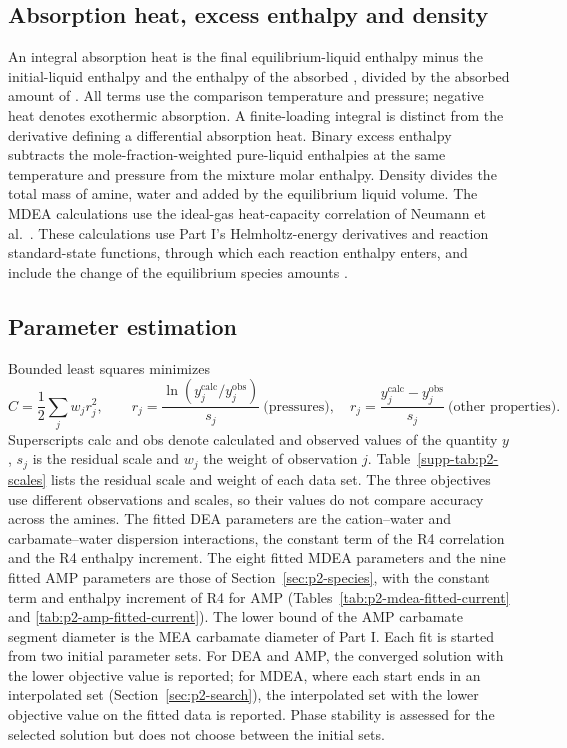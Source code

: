 \subsection{Absorption heat, excess enthalpy and density}\label{sec:p2-caloric}
An integral absorption heat is the final equilibrium-liquid enthalpy minus the initial-liquid enthalpy and the enthalpy of the absorbed \COtwo, divided by the absorbed amount of \COtwo.
All terms use the comparison temperature and pressure; negative heat denotes exothermic absorption.
A finite-loading integral is distinct from the derivative defining a differential absorption heat.
Binary excess enthalpy subtracts the mole-fraction-weighted pure-liquid enthalpies at the same temperature and pressure from the mixture molar enthalpy.
Density divides the total mass of amine, water and added \COtwo by the equilibrium liquid volume.
The MDEA calculations use the ideal-gas heat-capacity correlation of Neumann et al.\ \cite{neumannThermodynamicPropertiesMethyl2022}.
These calculations use Part I's Helmholtz-energy derivatives and reaction standard-state functions, through which each reaction enthalpy enters, and include the change of the equilibrium species amounts \cite[Sects.~2--3]{PolleyPartI}.

\subsection{Parameter estimation}\label{sec:p2-estimation}
Bounded least squares minimizes
\begin{equation}
 C=\frac12\sum_j w_jr_j^2,\qquad
 r_j=\frac{\ln(y_j^{\mathrm{calc}}/y_j^{\mathrm{obs}})}{s_j}\ \text{(pressures)},\quad
 r_j=\frac{y_j^{\mathrm{calc}}-y_j^{\mathrm{obs}}}{s_j}\ \text{(other properties)}.
 \label{eq:p2-objective}
\end{equation}
Superscripts calc and obs denote calculated and observed values of the quantity $y$, $s_j$ is the residual scale and $w_j$ the weight of observation $j$.
Table~\ref{supp-tab:p2-scales} lists the residual scale and weight of each data set.
The three objectives use different observations and scales, so their values do not compare accuracy across the amines.
The fitted DEA parameters are the cation--water and carbamate--water dispersion interactions, the constant term of the R4 correlation and the R4 enthalpy increment.
The eight fitted MDEA parameters and the nine fitted AMP parameters are those of Section~\ref{sec:p2-species}, with the constant term and enthalpy increment of R4 for AMP (Tables~\ref{tab:p2-mdea-fitted-current} and \ref{tab:p2-amp-fitted-current}).
The lower bound of the AMP carbamate segment diameter is the MEA carbamate diameter of Part I.
Each fit is started from two initial parameter sets.
For DEA and AMP, the converged solution with the lower objective value is reported; for MDEA, where each start ends in an interpolated set (Section~\ref{sec:p2-search}), the interpolated set with the lower objective value on the fitted data is reported.
Phase stability is assessed for the selected solution but does not choose between the initial sets.

